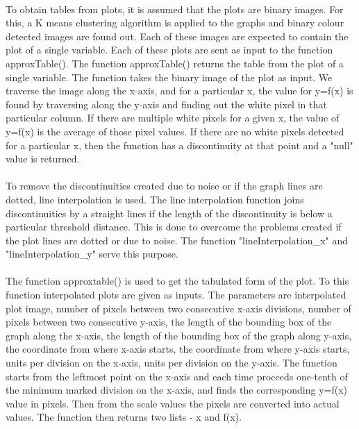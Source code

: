 \documentclass[12pts]{scrreprt}
\begin{document}
\paragraph{}
To obtain tables from plots, it is assumed that the plots are binary images. For this, a K means clustering algorithm is applied to the graphs and binary colour detected images are found out. Each of these images are expected to contain the plot of a single variable. Each of these plots are sent as input to the function approxTable(). The function approxTable() returns the table from the plot of a single variable. The function takes the binary image of the plot as input. We traverse the image along the x-axis, and for a particular x, the value for y=f(x) is found by traversing along the y-axis and finding out the white pixel in that particular column. If there are multiple white pixels for a given x, the value of y=f(x) is the average of those pixel values. If there are no white pixels detected for a particular x, then the function has a discontinuity at that point and a "null" value is returned.
\paragraph{}
To remove the discontinuities created due to noise or if the graph lines are dotted, line interpolation is used. The line interpolation function joins discontinuities by a straight lines if the length of the discontinuity is below a particular threshold distance. This is done to overcome the problems created if the plot lines are dotted or due to noise. The  function "lineInterpolation_x" and "lineInterpolation_y" serve this purpose.
\paragraph{}
The function approxtable() is used to get the tabulated form of the plot. To this function interpolated plots are given as inputs. The parameters are interpolated plot image, number of pixels between two consecutive x-axis divisions, number of pixels between two consecutive y-axis, the length of the bounding box of the graph along the x-axis, the length of the bounding box of the graph along y-axis, the coordinate from where x-axis starts, the coordinate from where y-axis starts, units per division on the x-axis, units per division on the y-axis.
The function starts from the leftmost point on the x-axis and each time proceeds one-tenth of the minimum marked division on the x-axis, and finds the corresponding y=f(x) value in pixels. Then from the scale values the pixels are converted into actual values. The function then returns two lists - x and f(x).
  
\end{document}
